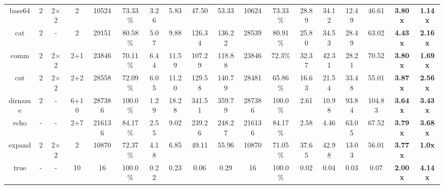 \begin{table*}[t]
{\begin{tabular}{cccc|cccccc|cccccccc}
  base64  &          2 &        2$\times$2 &        2 &      10524 &       73.33\% &            3.26 &             5.83 &          47.50 &           53.33 &        10624 &         73.33\% &             28.89 &              34.12 &            12.49 &             46.61 &        \textbf{3.80x} &         \textbf{1.14x} \\
  cat     &          2 &        -          &        2 &      29151 &       80.58\% &            5.07 &             9.88 &         126.34 &          136.22 &        28539 &         80.91\% &             25.80 &              34.53 &            28.49 &             63.02 &        \textbf{4.43x} &         \textbf{2.16x} \\
  comm    &          2 &        2$\times$2 &      2+1 &      23846 &       70.11\% &            6.44 &            11.59 &         107.29 &          118.88 &        23846 &          72.3\% &             32.37 &              42.31 &            28.21 &             70.52 &        \textbf{3.80x} &         \textbf{1.69x} \\
  cut     &          2 &        2$\times$2 &      2+2 &      28558 &       72.09\% &            6.05 &            11.20 &         129.58 &          140.79 &        28481 &         65.86\% &             16.63 &              21.54 &            33.48 &             55.01 &        \textbf{3.87x} &         \textbf{2.56x} \\
  dirname &          2 &        -          &     6+10 &     287386 &       100.0\% &            1.29 &            18.28 &         341.51 &          359.79 &       287386 &         100.0\% &              2.61 &              10.98 &            93.84 &            104.83 &        \textbf{3.64x} &         \textbf{3.43x} \\
  echo    &          - &        -          &      2+7 &     216136 &       84.17\% &            2.55 &             9.02 &         239.26 &          248.27 &       216136 &         84.17\% &              2.58 &               4.46 &            63.05 &             67.52 &        \textbf{3.79x} &         \textbf{3.68x} \\
  expand  &          2 &        2$\times$2 &        2 &      10870 &       72.37\% &            4.18 &             6.85 &          49.11 &           55.96 &        10870 &         71.05\% &             37.65 &              42.98 &            13.03 &             56.01 &        \textbf{3.77x} &         \textbf{1.0x} \\
  true    &          - &        -          &       10 &         16 &       100.0\% &            0.22 &             0.23 &           0.06 &            0.29 &           16 &         100.0\% &              0.02 &               0.04 &             0.03 &              0.07 &        \textbf{2.00x} &         \textbf{4.14x} \\

\end{tabular}}
\end{table*}
